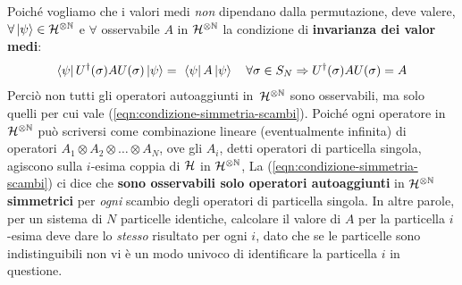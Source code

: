 \documentclass[../../FisicaTeorica.tex]{subfiles}
\begin{document}
Poiché vogliamo che i valori medi \textit{non} dipendano dalla permutazione, deve valere, $\forall \Ket{\psi}\in \mathcal{H}^{\otimes \mathbb{N}}$ e $\forall$ osservabile $A$ in $\mathcal{H}^{\otimes \mathbb{N}}$ la condizione di \textbf{invarianza dei valor medi}:
\begin{align}
\bra{\psi} U^\dag(\sigma)AU(\sigma)\ket{\psi} =\ \bra{\psi}A\ket{\psi}\quad \forall \sigma \in S_N \Rightarrow U^\dag(\sigma)AU(\sigma)=A
\label{eqn:condizione-simmetria-scambi}
\end{align}
Perciò non tutti gli operatori autoaggiunti in\ $\mathcal{H}^{\otimes \mathbb{N}}$ sono osservabili, ma solo quelli per cui vale (\ref{eqn:condizione-simmetria-scambi}). Poiché ogni operatore in $\mathcal{H}^{\otimes \mathbb{N}}$ può scriversi come combinazione lineare (eventualmente infinita) di operatori $A_1 \otimes A_2 \otimes \dots \otimes A_N$, ove gli $A_i$, detti operatori di particella singola, agiscono sulla $i$-esima coppia di $\mathcal{H}$ in $\mathcal{H}^{\otimes \mathbb{N}}$, La (\ref{eqn:condizione-simmetria-scambi}) ci dice che \textbf{sono osservabili solo operatori autoaggiunti} in $\mathcal{H}^{\otimes \mathbb{N}}$ \textbf{simmetrici} per \textit{ogni} scambio degli operatori di particella singola. In altre parole, per un sistema di $N$ particelle identiche, calcolare il valore di $A$ per la particella $i$-esima deve dare lo \textit{stesso} risultato per ogni $i$, dato che se le particelle sono indistinguibili non vi è un modo univoco di identificare la particella $i$ in questione.\\
\end{document}
